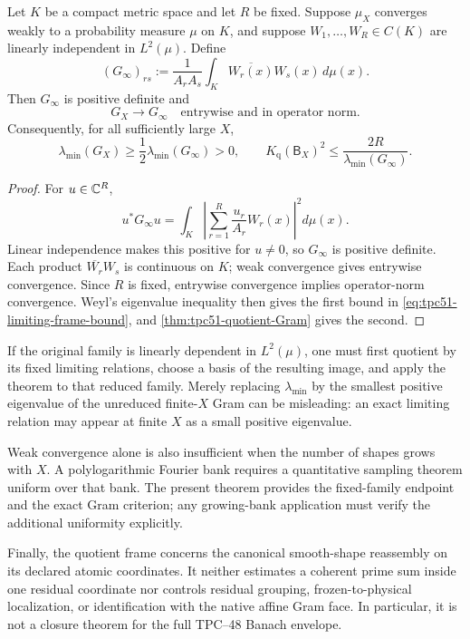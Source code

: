 \begin{theorem}
\label{thm:tpc51-limiting-frame}
\label{thm:tpc51-limit-gram}
Let \(K\) be a compact metric space and let \(R\) be fixed.  Suppose
\(\mu_X\) converges weakly to a probability measure \(\mu\) on \(K\),
and suppose \(W_1,\ldots,W_R\in C(K)\) are linearly independent in
\(L^2(\mu)\).  Define
\begin{equation}
 (G_\infty)_{rs}
 :=\frac1{A_rA_s}
   \int_K\overline{W_r(x)}W_s(x)\,d\mu(x).
 \label{eq:tpc51-limiting-Gram}
\end{equation}
Then \(G_\infty\) is positive definite and
\begin{equation}
 G_X\longrightarrow G_\infty
 \quad\text{entrywise and in operator norm}.
 \label{eq:tpc51-Gram-convergence}
\end{equation}
Consequently, for all sufficiently large \(X\),
\begin{equation}
 \lambda_{\min}(G_X)
 \ge\frac12\lambda_{\min}(G_\infty)>0,
 \qquad
 K_{\mathrm q}(\mathsf B_X)^2
 \le\frac{2R}{\lambda_{\min}(G_\infty)}.
 \label{eq:tpc51-limiting-frame-bound}
\end{equation}
\end{theorem}

\begin{proof}
For \(u\in\mathbb C^R\),
\[
 u^*G_\infty u
 =\int_K\left|
   \sum_{r=1}^R\frac{u_r}{A_r}W_r(x)
  \right|^2d\mu(x).
\]
Linear independence makes this positive for \(u\ne0\), so
\(G_\infty\) is positive definite.  Each product
\(\overline{W_r}W_s\) is continuous on \(K\); weak convergence gives
entrywise convergence.  Since \(R\) is fixed, entrywise convergence
implies operator-norm convergence.  Weyl's eigenvalue inequality then
gives the first bound in \eqref{eq:tpc51-limiting-frame-bound}, and
\cref{thm:tpc51-quotient-Gram} gives the second.
\end{proof}

If the original family is linearly dependent in \(L^2(\mu)\), one must
first quotient by its fixed limiting relations, choose a basis of the
resulting image, and apply the theorem to that reduced family.  Merely
replacing \(\lambda_{\min}\) by the smallest positive eigenvalue of the
unreduced finite-\(X\) Gram can be misleading: an exact limiting
relation may appear at finite \(X\) as a small positive eigenvalue.

Weak convergence alone is also insufficient when the number of shapes
grows with \(X\).  A polylogarithmic Fourier bank requires a quantitative
sampling theorem uniform over that bank.  The present theorem provides
the fixed-family endpoint and the exact Gram criterion; any growing-bank
application must verify the additional uniformity explicitly.

Finally, the quotient frame concerns the canonical smooth-shape
reassembly on its declared atomic coordinates.  It neither estimates a
coherent prime sum inside one residual coordinate nor controls residual
grouping, frozen-to-physical localization, or identification with the
native affine Gram face.  In particular, it is not a closure theorem for
the full TPC--48 Banach envelope.
